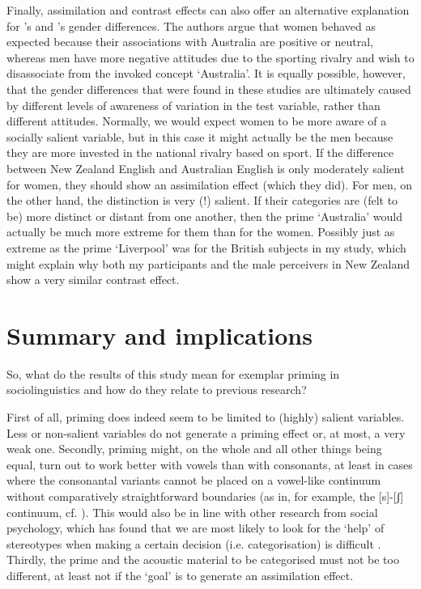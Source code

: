 Finally, assimilation and contrast effects can also offer an alternative explanation for \textcite{hayetal2006a}'s and \textcite{haydrager2010}'s gender differences.
The authors argue that women behaved as expected because their associations with Australia are positive or neutral, whereas men have more negative attitudes due to the sporting rivalry and wish to disassociate from the invoked concept `Australia'.
It is equally possible, however, that the gender differences that were found in these studies are ultimately caused by different levels of awareness of variation in the test variable, rather than different attitudes.
Normally, we would expect women to be more aware of a socially salient variable, but in this case it might actually be the men because they are more invested in the national rivalry based on sport.
If the difference between New Zealand English and Australian English is only moderately salient for women, they should show an assimilation effect (which they did).
For men, on the other hand, the distinction is very (!) salient.
If their categories are (felt to be) more distinct or distant from one another, then the prime `Australia' would actually be much more extreme for them than for the women.
Possibly just as extreme as the prime `Liverpool' was for the British subjects in my study, which might explain why both my participants and the male perceivers in New Zealand show a very similar contrast effect.

	\section{Summary and implications}

So, what do the results of this study mean for exemplar priming in sociolinguistics and how do they relate to previous research?

First of all, priming does indeed seem to be limited to (highly) salient variables.
Less or non-salient variables do not generate a priming effect or, at most, a very weak one.
Secondly, priming might, on the whole and all other things being equal, turn out to work better with vowels than with consonants, at least in cases where the consonantal variants cannot be placed on a vowel-like continuum without comparatively straightforward boundaries (as in, for example, the [s]-[ʃ] continuum, cf. \citealt{strand1999}).
This would also be in line with other research from social psychology, which has found that we are most likely to look for the `help' of stereotypes when making a certain decision (i.e. categorisation) is difficult \parencite[cf.][28]{petersensix2008}.
Thirdly, the prime and the acoustic material to be categorised must not be too different, at least not if the `goal' is to generate an assimilation effect.

